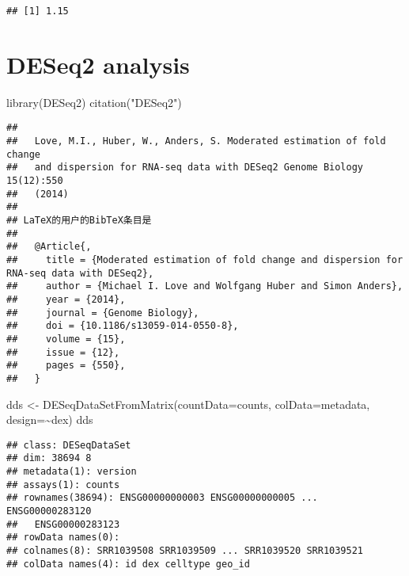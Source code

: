 \documentclass[
]{article}
\newenvironment{Shaded}{\begin{snugshade}}{\end{snugshade}}
\newcommand{\AttributeTok}[1]{\textcolor[rgb]{0.77,0.63,0.00}{#1}}
\newcommand{\FunctionTok}[1]{\textcolor[rgb]{0.00,0.00,0.00}{#1}}
\newcommand{\NormalTok}[1]{#1}
\newcommand{\OtherTok}[1]{\textcolor[rgb]{0.56,0.35,0.01}{#1}}
\newcommand{\SpecialCharTok}[1]{\textcolor[rgb]{0.00,0.00,0.00}{#1}}
\newcommand{\StringTok}[1]{\textcolor[rgb]{0.31,0.60,0.02}{#1}}
\begin{document}
\begin{verbatim}
## [1] 1.15
\end{verbatim}

\hypertarget{deseq2-analysis}{%
\section{DESeq2 analysis}\label{deseq2-analysis}}

\begin{Shaded}
\begin{Highlighting}[]
\FunctionTok{library}\NormalTok{(DESeq2)}
\FunctionTok{citation}\NormalTok{(}\StringTok{"DESeq2"}\NormalTok{)}
\end{Highlighting}
\end{Shaded}

\begin{verbatim}
## 
##   Love, M.I., Huber, W., Anders, S. Moderated estimation of fold change
##   and dispersion for RNA-seq data with DESeq2 Genome Biology 15(12):550
##   (2014)
## 
## LaTeX的用户的BibTeX条目是
## 
##   @Article{,
##     title = {Moderated estimation of fold change and dispersion for RNA-seq data with DESeq2},
##     author = {Michael I. Love and Wolfgang Huber and Simon Anders},
##     year = {2014},
##     journal = {Genome Biology},
##     doi = {10.1186/s13059-014-0550-8},
##     volume = {15},
##     issue = {12},
##     pages = {550},
##   }
\end{verbatim}

\begin{Shaded}
\begin{Highlighting}[]
\NormalTok{dds }\OtherTok{\textless{}{-}} \FunctionTok{DESeqDataSetFromMatrix}\NormalTok{(}\AttributeTok{countData=}\NormalTok{counts, }
                              \AttributeTok{colData=}\NormalTok{metadata, }
                              \AttributeTok{design=}\SpecialCharTok{\textasciitilde{}}\NormalTok{dex)}
\NormalTok{dds}
\end{Highlighting}
\end{Shaded}

\begin{verbatim}
## class: DESeqDataSet 
## dim: 38694 8 
## metadata(1): version
## assays(1): counts
## rownames(38694): ENSG00000000003 ENSG00000000005 ... ENSG00000283120
##   ENSG00000283123
## rowData names(0):
## colnames(8): SRR1039508 SRR1039509 ... SRR1039520 SRR1039521
## colData names(4): id dex celltype geo_id
\end{verbatim}
\end{document}
